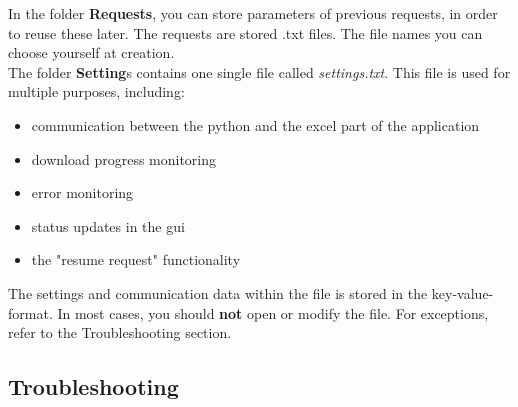 In the folder \textbf{Requests}, you can store parameters of previous requests, in order to reuse these later. The requests are stored .txt files. The file names you can choose yourself at creation. \\

The folder \textbf{Setting}s contains one single file called \textit{settings.txt}. This file is used for multiple purposes, including: 

\begin{itemize}
	\item communication between the python and the excel part of the application
	\item download progress monitoring
	\item error monitoring
	\item status updates in the gui
	\item the "resume request" functionality
\end{itemize}
The settings and communication data within the file is stored in the key-value-format. In most cases, you should \textbf{not} open or modify the file. For exceptions, refer to the Troubleshooting section. 

\subsection{Troubleshooting}


